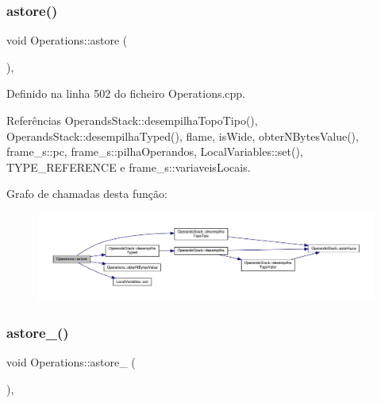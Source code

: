 \subsubsection{\texorpdfstring{astore()}{astore()}}
{\footnotesize\ttfamily void Operations\+::astore (\begin{DoxyParamCaption}{ }\end{DoxyParamCaption})\hspace{0.3cm}{\ttfamily [static]}, {\ttfamily [private]}}



Definido na linha 502 do ficheiro Operations.\+cpp.



Referências Operands\+Stack\+::desempilha\+Topo\+Tipo(), Operands\+Stack\+::desempilha\+Typed(), flame, is\+Wide, obter\+N\+Bytes\+Value(), frame\+\_\+s\+::pc, frame\+\_\+s\+::pilha\+Operandos, Local\+Variables\+::set(), T\+Y\+P\+E\+\_\+\+R\+E\+F\+E\+R\+E\+N\+CE e frame\+\_\+s\+::variaveis\+Locais.

Grafo de chamadas desta função\+:
\nopagebreak
\begin{figure}[H]
\begin{center}
\leavevmode
\includegraphics[width=350pt]{classOperations_aa414424bd203fb9788712fd2e74c3a32_cgraph}
\end{center}
\end{figure}
\mbox{\label{classOperations_a140f2e8501424f8a73dbfecfa3ca859f}} 
\subsubsection{\texorpdfstring{astore\+\_()}{astore\_0()}}
{\footnotesize\ttfamily void Operations\+::astore\+\_ (\begin{DoxyParamCaption}{ }\end{DoxyParamCaption})\hspace{0.3cm}{\ttfamily [static]}, {\ttfamily [private]}}



